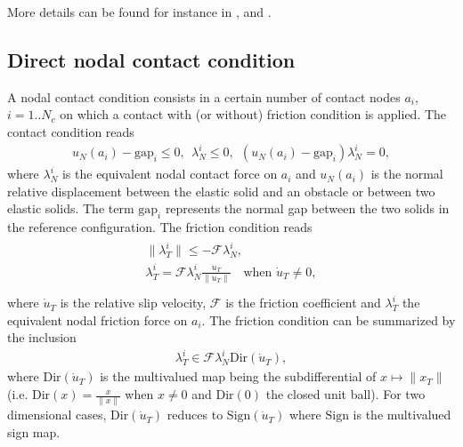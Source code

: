 \documentclass[a4paper,11pt,english]{sphinxmanual}
\begin{document}
More details can be found for instance in ,  and .


\subsection{Direct nodal contact condition}
\label{\detokenize{userdoc/model_contact_friction:direct-nodal-contact-condition}}
A nodal contact condition consists in a certain number of contact nodes \(a_i\), \(i=1..N_c\) on which a contact with (or without) friction condition is applied. The contact condition reads
\begin{equation*}
\begin{split}u_N(a_i)-\text{gap}_i \le 0, ~~ \lambda_N^i \le 0,  ~~ (u_N(a_i)-\text{gap}_i) \lambda_N^i = 0,\end{split}
\end{equation*}
where \(\lambda_N^i\) is the equivalent nodal contact force on \(a_i\) and \(u_N(a_i)\) is the normal relative displacement between the elastic solid and an obstacle or between two elastic solids. The term \(\text{gap}_i\) represents the normal gap between the two solids in the reference configuration. The friction condition reads
\begin{align*}\!\begin{aligned}
\|\lambda_T^i\| \le -{\mathscr F} \lambda_N^i,\\
\lambda_T^i = {\mathscr F} \lambda_N^i \frac{\dot{u}_T}{\|\dot{u}_T\|} ~~~ \text{ when } \dot{u}_T \ne 0,\\
\end{aligned}\end{align*}
where \(\dot{u}_T\) is the relative slip velocity, \({\mathscr F}\) is the friction coefficient and \(\lambda_T^i\) the equivalent nodal friction force on \(a_i\). The friction condition can be summarized by the inclusion
\begin{equation*}
\begin{split}\lambda_T^i \in {\mathscr F} \lambda_N^i \text{Dir}(\dot{u}_T),\end{split}
\end{equation*}
where \(\text{Dir}(\dot{u}_T)\) is the multivalued map being the sub\sphinxhyphen{}differential of \(x \mapsto \|x_T\|\) (i.e. \(\text{Dir}(x) = \frac{x}{\|x\|}\) when \(x \ne 0\) and \(\text{Dir}(0)\) the closed unit ball). For two dimensional cases, \(\text{Dir}(\dot{u}_T)\) reduces to \(\text{Sign}(\dot{u}_T)\) where \(\text{Sign}\) is the multivalued sign map.
\end{document}
